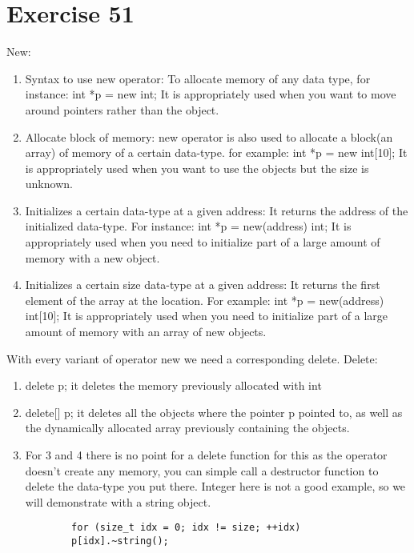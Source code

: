 \section*{Exercise 51}
New: 
\newline
\begin{enumerate}
    \item Syntax to use new operator: To allocate memory of any data type, for instance: int *p = new int; It is appropriately used when you want to move around pointers rather than the object.
    \item Allocate block of memory: new operator is also used to allocate a block(an array) of memory of a certain data-type. for example: int *p = new int[10]; It is appropriately used when you want to use the objects but the size is unknown. 
    \item Initializes a certain data-type at a given address: It returns the address of the initialized data-type. For instance: int *p = new(address) int; It is appropriately used when you need to initialize part of a large amount of memory with a new object.
    \item Initializes a certain size data-type at a given address: It returns the first element of the array at the location. For example: int *p = new(address) int[10]; It is appropriately used when you need to initialize part of a large amount of memory with an array of new objects.
\end{enumerate}
With every variant of operator new we need a corresponding delete.
\newline
Delete: 
\begin{enumerate}
    \item delete p; it deletes the memory previously allocated with int
    \item delete[] p; it deletes all the objects where the pointer p pointed to, as well as the dynamically allocated array previously containing the objects.
    \item For 3 and 4 there is no point for a delete function for this as the operator doesn't create any memory, you can simple call a destructor function to delete the data-type you put there. Integer here is not a good example, so we will demonstrate with a string object. 
    \begin{lstlisting}
        for (size_t idx = 0; idx != size; ++idx)
        p[idx].~string();
    \end{lstlisting}
\end{enumerate}
